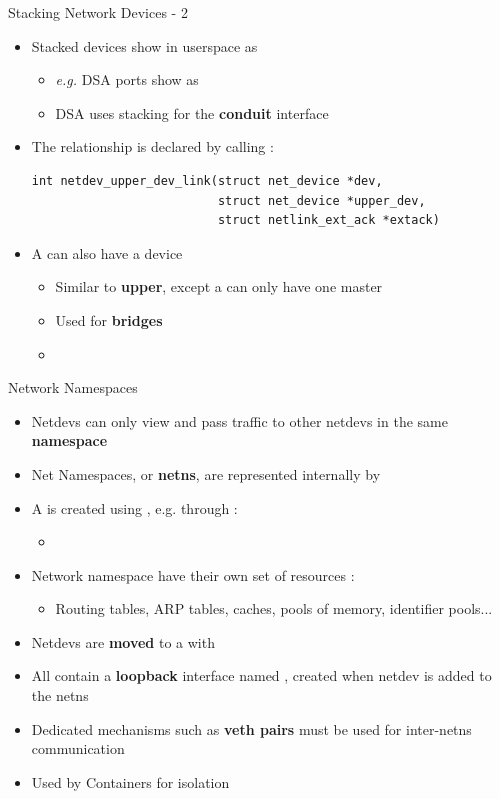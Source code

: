 \begin{frame}[fragile]{Stacking Network Devices - 2}
	\begin{itemize}
		\item Stacked devices show in userspace as 
			\begin{itemize}
				\item \textit{e.g.} DSA ports show as 
				\item DSA uses stacking for the \textbf{conduit} interface
			\end{itemize}
		\item The relationship is declared by calling :
			\begin{verbatim}
int netdev_upper_dev_link(struct net_device *dev,
                          struct net_device *upper_dev,
                          struct netlink_ext_ack *extack)
			\end{verbatim}
		\item A  can also have a  device
			\begin{itemize}
				\item Similar to \textbf{upper}, except a  can only have one master
				\item Used for \textbf{bridges}
				\item {}
			\end{itemize}
	\end{itemize}
\end{frame}

\begin{frame}{Network Namespaces}
	\begin{itemize}
		\item Netdevs can only view and pass traffic to other netdevs in the same \textbf{namespace}
		\item Net Namespaces, or \textbf{netns}, are represented internally by 
		\item A  is created using , e.g. through  :
			\begin{itemize}
				\item {}
			\end{itemize}
		\item Network namespace have their own set of resources :
			\begin{itemize}
				\item Routing tables, ARP tables, caches, pools of memory, identifier pools...
			\end{itemize}
		\item Netdevs are \textbf{moved} to a  with 
		\item All  contain a \textbf{loopback} interface named , created when netdev is added to the netns
		\item Dedicated mechanisms such as \textbf{veth pairs} must be used for inter-netns communication
		\item Used by Containers for isolation
	\end{itemize}
\end{frame}

